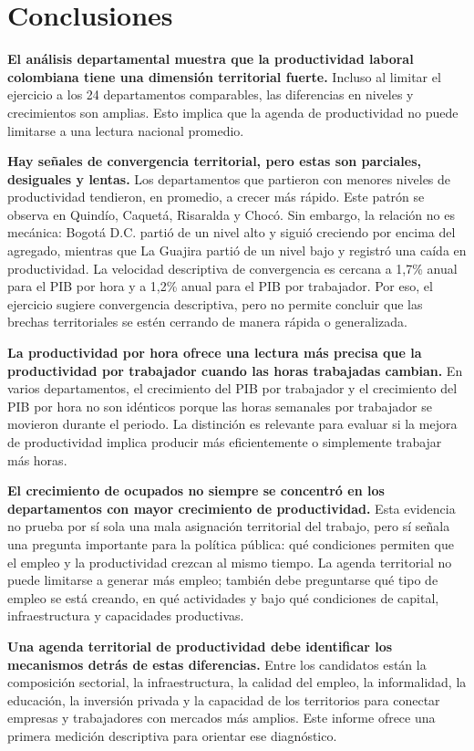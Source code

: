 \section{Conclusiones}

\textbf{El análisis departamental muestra que la productividad laboral colombiana tiene una dimensión territorial fuerte.} Incluso al limitar el ejercicio a los 24 departamentos comparables, las diferencias en niveles y crecimientos son amplias. Esto implica que la agenda de productividad no puede limitarse a una lectura nacional promedio.

\textbf{Hay señales de convergencia territorial, pero estas son parciales, desiguales y lentas.} Los departamentos que partieron con menores niveles de productividad tendieron, en promedio, a crecer más rápido. Este patrón se observa en Quindío, Caquetá, Risaralda y Chocó. Sin embargo, la relación no es mecánica: Bogotá D.C. partió de un nivel alto y siguió creciendo por encima del agregado, mientras que La Guajira partió de un nivel bajo y registró una caída en productividad. La velocidad descriptiva de convergencia es cercana a 1,7\% anual para el PIB por hora y a 1,2\% anual para el PIB por trabajador. Por eso, el ejercicio sugiere convergencia descriptiva, pero no permite concluir que las brechas territoriales se estén cerrando de manera rápida o generalizada.

\textbf{La productividad por hora ofrece una lectura más precisa que la productividad por trabajador cuando las horas trabajadas cambian.} En varios departamentos, el crecimiento del PIB por trabajador y el crecimiento del PIB por hora no son idénticos porque las horas semanales por trabajador se movieron durante el periodo. La distinción es relevante para evaluar si la mejora de productividad implica producir más eficientemente o simplemente trabajar más horas.

\textbf{El crecimiento de ocupados no siempre se concentró en los departamentos con mayor crecimiento de productividad.} Esta evidencia no prueba por sí sola una mala asignación territorial del trabajo, pero sí señala una pregunta importante para la política pública: qué condiciones permiten que el empleo y la productividad crezcan al mismo tiempo. La agenda territorial no puede limitarse a generar más empleo; también debe preguntarse qué tipo de empleo se está creando, en qué actividades y bajo qué condiciones de capital, infraestructura y capacidades productivas.

\textbf{Una agenda territorial de productividad debe identificar los mecanismos detrás de estas diferencias.} Entre los candidatos están la composición sectorial, la infraestructura, la calidad del empleo, la informalidad, la educación, la inversión privada y la capacidad de los territorios para conectar empresas y trabajadores con mercados más amplios. Este informe ofrece una primera medición descriptiva para orientar ese diagnóstico.
